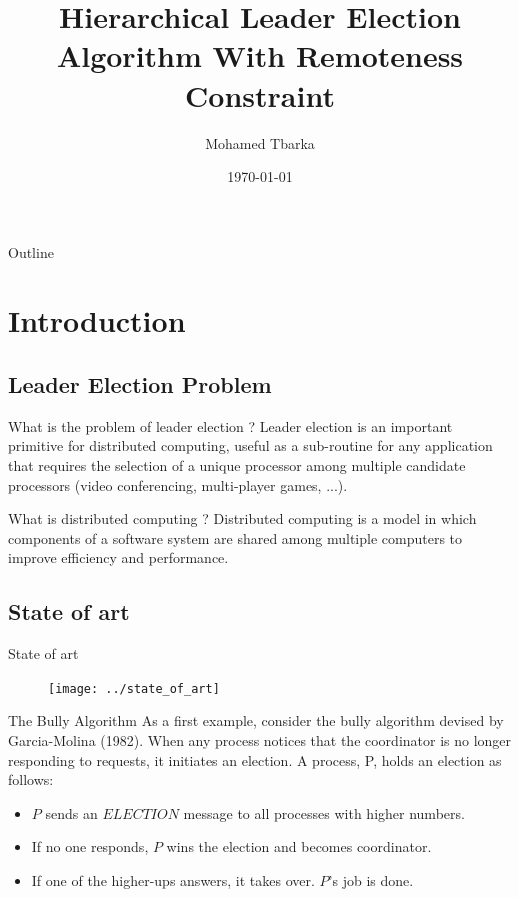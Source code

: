 \documentclass{beamer}
\title{Hierarchical Leader Election Algorithm With Remoteness Constraint}
\author{Mohamed Tbarka}
\date{\today}
\begin{document}

\frame{\titlepage}

\section[Outline]{}
\begingroup
\tiny
\begin{frame}{Outline}

  \tableofcontents
\end{frame}
\endgroup
\section{Introduction}
\subsection{Leader Election Problem}
\begin{frame}{What is the problem of leader election ?}
Leader election is an important primitive for distributed computing, useful as a sub-routine for any application that requires the selection of a unique processor among multiple candidate processors (video conferencing, multi-player games, ...).
\end{frame}

\begin{frame}{What is distributed computing ?}
Distributed computing is a model in which components of a software system are shared among multiple computers to improve efficiency and performance.
\end{frame}

\subsection{State of art}
\begin{frame}{State of art}
	\begin{figure}
		\centering
		\texttt{[image: ../state\_of\_art]}
		\caption{}
		\label{fig:stateofart}
	\end{figure}
\end{frame}
\iffalse
\begin{frame}{The Bully Algorithm}
  As a first example, consider the bully algorithm devised by Garcia-Molina (1982). When any process notices that the coordinator is no longer responding to requests, it initiates an election. A process, P, holds an election as follows:
  \pause
  \begin{itemize}
    \item <2-> $P$ sends an $ELECTION$ message to all processes with higher numbers.
    \item <3-> If no one responds, $P$ wins the election and becomes coordinator.
    \item <4-> If one of the higher-ups answers, it takes over. $P$'s job is done.
  \end{itemize}
\end{frame}
\end{document}
